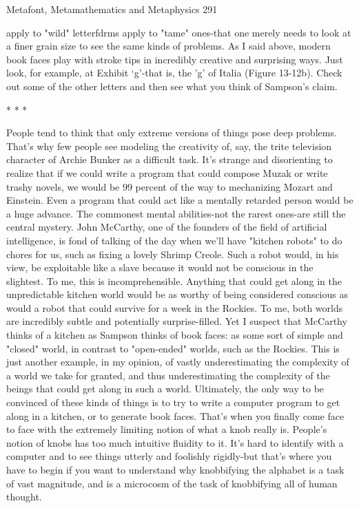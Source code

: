 Metafont, Metamathematics and Metaphysics                                                291

apply to "wild" letterfdrms apply to "tame" ones-that one merely needs to look at a finer
grain size to see the same kinds of problems. As I said above, modern book faces play
with stroke tips in incredibly creative and surprising ways. Just look, for example, at
Exhibit `g'-that is, the 'g' of Italia (Figure 13-12b). Check out some of the other letters and
then see what you think of Sampson's claim.

                                          *   *    *

         People tend to think that only extreme versions of things pose deep problems.
That's why few people see modeling the creativity of, say, the trite television character of
Archie Bunker as a difficult task. It's strange and disorienting to realize that if we could
write a program that could compose Muzak or write trashy novels, we would be 99
percent of the way to mechanizing Mozart and Einstein. Even a program that could act
like a mentally retarded person would be a huge advance. The commonest mental
abilities-not the rarest ones-are still the central mystery.
         John McCarthy, one of the founders of the field of artificial intelligence, is fond
of talking of the day when we'll have "kitchen robots" to do chores for us, such as fixing
a lovely Shrimp Creole. Such a robot would, in his view, be exploitable like a slave
because it would not be conscious in the slightest. To me, this is incomprehensible.
Anything that could get along in the unpredictable kitchen world would be as worthy of
being considered conscious as would a robot that could survive for a week in the Rockies.
To me, both worlds are incredibly subtle and potentially surprise-filled. Yet I suspect that
McCarthy thinks of a kitchen as Sampson thinks of book faces: as some sort of simple
and "closed" world, in contrast to "open-ended" worlds, such as the Rockies. This is just
another example, in my opinion, of vastly underestimating the complexity of a world we
take for granted, and thus underestimating the complexity of the beings that could get
along in such a world.
         Ultimately, the only way to be convinced of these kinds of things is to try to write
a computer program to get along in a kitchen, or to generate book faces. That's when you
finally come face to face with the extremely limiting notion of what a knob really is.
People's notion of knobs has too much intuitive fluidity to it. It's hard to identify with a
computer and to see things utterly and foolishly rigidly-but that's where you have to
begin if you want to understand why knobbifying the alphabet is a task of vast
magnitude, and is a microcosm of the task of knobbifying all of human thought.

